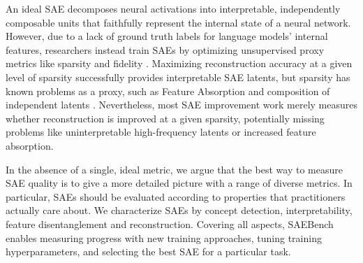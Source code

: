 \documentclass{article}
\theoremstyle{plain}
\theoremstyle{definition}
\theoremstyle{remark}
\begin{document}
An ideal SAE decomposes neural activations into interpretable, independently composable units that faithfully represent the internal state of a neural network. However, due to a lack of ground truth labels for language models' internal features, researchers instead train SAEs by optimizing unsupervised proxy metrics like sparsity and fidelity \cite{cunningham2023sparseautoencodershighlyinterpretable}. Maximizing reconstruction accuracy at a given level of sparsity successfully provides interpretable SAE latents, but sparsity has known problems as a proxy, such as Feature Absorption \cite{chanin2024absorption} and composition of independent latents \cite{bussmann2024metasae}. Nevertheless, most SAE improvement work merely measures whether reconstruction is improved at a given sparsity, potentially missing problems like uninterpretable high-frequency latents or increased feature absorption.

In the absence of a single, ideal metric, we argue that the best way to measure SAE quality is to give a more detailed picture with a range of diverse metrics. In particular, SAEs should be evaluated according to properties that practitioners actually care about.
We characterize SAEs by concept detection, interpretability, feature disentanglement and reconstruction. Covering all aspects, SAEBench enables measuring progress with new training approaches, tuning training hyperparameters, and selecting the best SAE for a particular task. 
\end{document}
